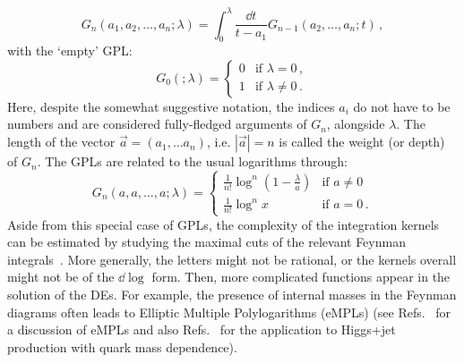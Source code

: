 \documentclass[main.tex]{subfiles}
\begin{document}
\begin{equation} \label{eq:GPLs}
    G_n(a_1, a_2, \ldots, a_n; \lambda) = \int_0^\lambda \frac{\dd t}{t-a_1} G_{n-1}(a_2, \ldots, a_n; t)\,,
\end{equation}
with the `empty' GPL:
\begin{equation}
    G_0(; \lambda) = 
    \begin{cases}
        0 & \text{if } \lambda = 0\,, \\
        1 & \text{if } \lambda \neq 0\,. 
    \end{cases}
\end{equation}
Here, despite the somewhat suggestive notation, the indices $a_i$ do not have to be numbers and are considered fully-fledged arguments of $G_n$, alongside $\lambda$. The length of the vector $\vec{a} = (a_1, \ldots a_n)$, i.e. $|\vec{a}|=n$ is called the weight (or depth) of $G_n$. The GPLs are related to the usual logarithms through:
\begin{equation}
    G_n(a, a, \ldots, a; \lambda) = 
    \begin{cases}
        \frac{1}{n!}\log^n\left(1-\frac{\lambda}{a}\right) & \text{if  $a \neq 0$} \\ 
        \frac{1}{n!}\log^n x & \text{if $a = 0$}\,.
    \end{cases}
\end{equation}  
Aside from this special case of GPLs, the complexity of the integration kernels can be estimated by studying the maximal cuts of the relevant Feynman integrals~\cite{Tancredi:2017onthemaxcut, Abreu:2020jxa, abreu2021twoloop}. More generally, the letters might not be rational, or the kernels overall might not be of the $\dd \log$ form. Then, more complicated functions appear in the solution of the DEs.  For example, the presence of internal masses in the Feynman diagrams often  leads to Elliptic Multiple Polylogarithms (eMPLs) (see Refs.~ \cite{Broedel:2017kkb, Broedel:2017siw, Adams:2017ejb, Broedel:2018qkq, Adams:2018yfj, Walden:2020odh} for a discussion of eMPLs and also Refs.~\cite{Bonciani:2016qxi, Bonciani:2019jyb, Frellesvig:2019byn} for the application to Higgs+jet production with quark mass dependence). 
\end{document}
